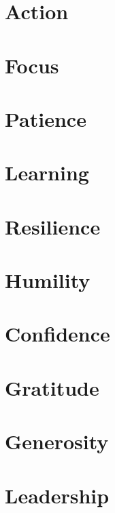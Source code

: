 \documentclass{book}
\begin{document}


\chapter{Action}

\chapter{Focus}

\chapter{Patience}

\chapter{Learning}

\chapter{Resilience}

\chapter{Humility}

\chapter{Confidence}

\chapter{Gratitude}

\chapter{Generosity}

\chapter{Leadership}

\end{document}
